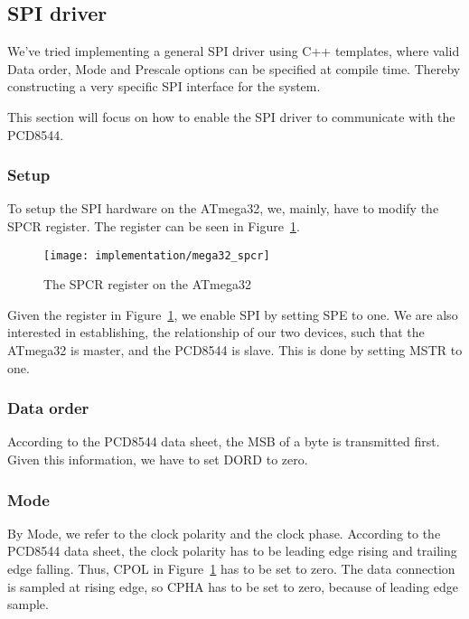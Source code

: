 \subsection{SPI driver}

We've tried implementing a general SPI driver using C++ templates, where valid Data order, Mode and Prescale options can be specified at compile time. Thereby constructing a very specific SPI interface for the system. 

This section will focus on how to enable the SPI driver to communicate with the PCD8544.

\subsubsection{Setup}

To setup the SPI hardware on the ATmega32, we, mainly, have to modify the SPCR register\cite[136]{atmel:mega32}. The register can be seen in Figure~\ref{fig:spcr}.

\begin{figure}
	\centering
	\texttt{[image: implementation/mega32\_spcr]}
	\caption{The SPCR register on the ATmega32\cite[136]{atmel:mega32}}
	\label{fig:spcr}
\end{figure}

Given the register in Figure~\ref{fig:spcr}, we enable SPI by setting SPE to one. We are also interested in establishing, the relationship of our two devices, such that the ATmega32 is master, and the PCD8544 is slave. This is done by setting MSTR to one\cite[137]{atmel:mega32}.

\subsubsection{Data order}

According to the PCD8544 data sheet, the MSB of a byte is transmitted first\cite[11]{philips:pcd8544}. Given this information, we have to set DORD to zero\cite[136]{atmel:mega32}.

\subsubsection{Mode}

By Mode, we refer to the clock polarity and the clock phase. According to the PCD8544 data sheet, the clock polarity has to be leading edge rising and trailing edge falling\cite[12]{philips:pcd8544}. Thus, CPOL in Figure~\ref{fig:spcr} has to be set to zero\cite[137]{atmel:mega32}. The data connection is sampled at rising edge\cite[11]{philips:pcd8544}, so CPHA has to be set to zero, because of leading edge sample\cite[137]{atmel:mega32}.

